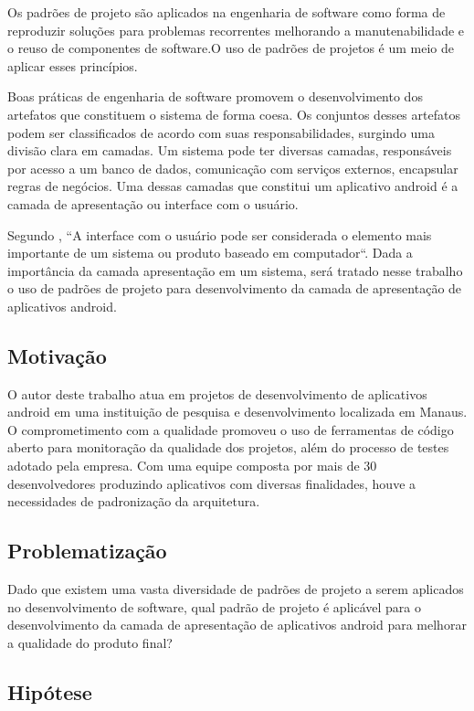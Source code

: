 \documentclass[conference]{IEEEtran}
\begin{document}
Os padrões de projeto são aplicados na engenharia de software como forma de
reproduzir  soluções  para problemas recorrentes melhorando a manutenabilidade e
o reuso de componentes de software\cite{gof}.O uso de padrões de projetos
é um meio de aplicar esses princípios.

Boas práticas de engenharia de software promovem o desenvolvimento dos
artefatos que constituem o sistema de forma coesa. Os conjuntos desses artefatos
podem ser classificados de acordo com suas responsabilidades, surgindo
uma divisão clara em camadas. Um sistema pode ter diversas camadas, responsáveis
por acesso a um banco de dados, comunicação com serviços externos, encapsular
regras de negócios. Uma dessas camadas que constitui um aplicativo android é a
camada de apresentação ou interface com o usuário.
 
Segundo , ``A interface com o usuário pode ser considerada
o elemento mais importante de um sistema ou produto baseado em computador``.
Dada a importância da camada apresentação em um sistema, será tratado nesse
trabalho o uso de padrões de projeto para desenvolvimento da camada de
apresentação de aplicativos android.

\subsection{Motivação}

O autor deste trabalho atua em projetos de desenvolvimento de aplicativos android em uma instituição de
pesquisa e desenvolvimento localizada em Manaus. O comprometimento com a
qualidade promoveu o uso de ferramentas de código aberto para monitoração da
qualidade dos projetos, além do processo de testes adotado pela empresa. Com uma
equipe composta por mais de 30 desenvolvedores produzindo aplicativos com
diversas finalidades, houve a necessidades de padronização da arquitetura.

\subsection{Problematização}
Dado que existem uma vasta diversidade de padrões de projeto a serem aplicados
no desenvolvimento de software, qual padrão de projeto é aplicável para o
desenvolvimento da camada de apresentação de aplicativos android para melhorar a
qualidade do produto final?

\subsection{Hipótese}
\end{document}
